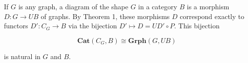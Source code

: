 If $G$ is any graph, a diagram of the shape $G$ in a category $B$ is a morphism $D: G \to UB$ of graphs. By Theorem 1, these morphisms $D$ correspond exactly to functors $D': C_G \to B$ via the bijection $D' \mapsto D = UD' \circ P$. This bijection

$$\mathbf{Cat}(C_G, B) \cong \mathbf{Grph}(G, UB)$$

is natural in $G$ and $B$.
